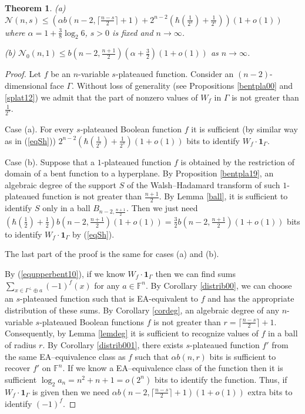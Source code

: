 \documentclass[a4paper,12pt]{article}   %
\newtheorem{theorem}{Theorem}
\begin{document}
\begin{theorem}\label{number_plat}
{\rm (a)}   $\mathcal{N}(n,s)\leq (\alpha
b(n-2,\lceil\frac{n-s}{2}\rceil+1)+2^{n-2}(\hbar(\frac{1}{2^s})+\frac{1}{2^s}))(1+o(1))$
where $\alpha= 1+\frac{3}{8}\log_2 6$, $s>0$ is fixed  and
$n\rightarrow\infty$.

{\rm (b)}  $\mathcal{N}_0(n,1)\leq
b(n-2,\frac{n+1}{2})(\alpha+\frac{3}{2})(1+o(1))$ as
$n\rightarrow\infty$.
\end{theorem}
\begin{proof}
Let $f$ be an $n$-variable $s$-plateaued function. Consider an
$(n-2)$-dimensional face $\Gamma$. Without loss of generality (see
Propositions \ref{bentpla00} and \ref{splat12}) we admit that the
part of nonzero values of $W_f$ in $\Gamma$ is not greater than
$\frac{1}{2^s}$.

Case (a).  For every $s$-plateaued Boolean function $f$ it is
sufficient (by similar way as  in (\ref{eqSh}))
$2^{n-2}(\hbar(\frac{1}{2^s})+\frac{1}{2^s})(1+o(1))$ bits to
identify $W_f\cdot \mathbf{1}_\Gamma$.

Case (b). Suppose that a $1$-plateaued function $f$ is  obtained by
the restriction of domain of a bent function to a hyperplane. By
Proposition \ref{bentpla19}, an algebraic degree of the support $S$
of the Walsh--Hadamard transform of such $1$-plateaued function is
not greater than $\frac{n+1}{2}$. By Lemma \ref{ball}, it is
sufficient to identify $S$ only in a ball $B_{n-2, \frac{n+1}{2}}$.
Then we just need $(\hbar(\frac12) +\frac12)b(n-2,
\frac{n+1}{2})(1+o(1))=\frac{3}{2}b(n-2, \frac{n+1}{2})(1+o(1))$
bits to identify $W_f\cdot \mathbf{1}_\Gamma$ by (\ref{eqSh}).

The last part of the proof is the same for cases (a) and (b).

By (\ref{equpperbent10}), if we know $W_f\cdot \mathbf{1}_\Gamma$
then we can find  sums $\sum\limits_{x\in \Gamma^\perp\oplus a}
(-1)^f(x)$ for any $a\in \mathbb{F}^n$. By Corollary
\ref{distrib00}, we can choose an $s$-plateaued function such that
is  EA-equivalent to $f$ and has  the appropriate distribution of
these sums. By Corollary \ref{cordeg}, an algebraic degree of any
$n$-variable $s$-plateaued Boolean functions $f$ is not greater than
$r=\lceil\frac{n-s}{2}\rceil+1$. Consequently,  by Lemma
\ref{lemdeg} it is sufficient to recognize values of $f$ in a ball
of radius $r$. By Corollary \ref{distrib001}, there exists
$s$-plateaued function $f'$ from the same EA--equivalence class as
$f$ such that $\alpha b(n,r)$ bits is sufficient to recover $f'$ on
$\mathbb{F}^n$. If we know  a EA--equivalence class of the function
then    it is sufficient $\log_2 a_n=n^2+n+1=o(2^n)$ bits to
identify the function.
 Thus, if $W_f\cdot \mathbf{1}_\Gamma$ is given then we need $\alpha
b(n-2,\lceil\frac{n-s}{2}\rceil+1)(1+o(1))$ extra bits to identify
$(-1)^f$.
\end{proof}
\end{document}
